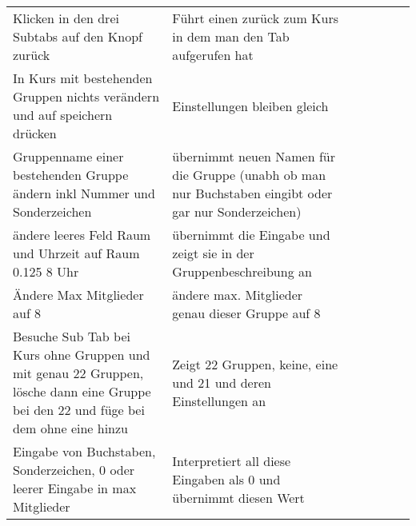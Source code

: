 \begin{table}[]
\begin{tabular}{p{6cm}p{7cm}p{3cm}llll}
		Klicken in den drei Subtabs auf den Knopf zurück                                                                                     & Führt einen zurück zum Kurs in dem man den Tab aufgerufen hat                                                                                                    & \checkmark           &  &  &  \\
		In Kurs mit bestehenden Gruppen nichts verändern und auf speichern drücken                                                            & Einstellungen bleiben gleich                                                                                                                                     & \checkmark           &  &  &  \\
		Gruppenname einer bestehenden Gruppe ändern inkl Nummer und Sonderzeichen                                                      & übernimmt neuen Namen für die Gruppe (unabh ob man nur Buchstaben eingibt oder gar nur Sonderzeichen)                                                            & \checkmark           &  &  &  \\
		ändere leeres Feld Raum und Uhrzeit auf Raum 0.125 8 Uhr                                                                           & übernimmt die Eingabe und zeigt sie in der Gruppenbeschreibung an                                                                                                & \checkmark           &  &  &  \\
		Ändere Max Mitglieder auf 8                                                                                                          & ändere max. Mitglieder genau dieser Gruppe auf 8                                                                                                                 & \checkmark           &  &  &  \\
		Besuche Sub Tab bei Kurs ohne Gruppen und mit genau 22 Gruppen, lösche dann eine Gruppe bei den 22 und füge bei dem ohne eine hinzu & Zeigt 22 Gruppen, keine, eine und 21 und deren Einstellungen an                                                                                                  & \checkmark           &  &  &  \\
		Eingabe von Buchstaben, Sonderzeichen, 0 oder leerer Eingabe  in max Mitglieder                                                      & Interpretiert all diese Eingaben als 0 und übernimmt diesen Wert                                                                                                 & \checkmark           &  &  &  \\

\end{tabular}
\end{table}
